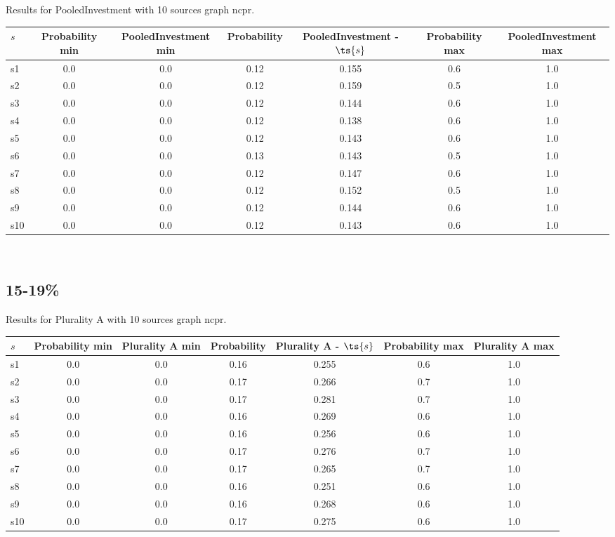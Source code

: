 \documentclass{article}
\begin{document}
\noindent Results for PooledInvestment with 10 sources graph ncpr.

\noindent\begin{tabular}{|l|c|c|c|c|c|c|}
\hline
$s$& Probability min & PooledInvestment min & Probability & PooledInvestment - $\ts{s}$ & Probability max & PooledInvestment max\\
\hline
s1 &0.0 & 0.0 & 0.12 & 0.155 & 0.6 & 1.0\\
\hline
s2 &0.0 & 0.0 & 0.12 & 0.159 & 0.5 & 1.0\\
\hline
s3 &0.0 & 0.0 & 0.12 & 0.144 & 0.6 & 1.0\\
\hline
s4 &0.0 & 0.0 & 0.12 & 0.138 & 0.6 & 1.0\\
\hline
s5 &0.0 & 0.0 & 0.12 & 0.143 & 0.6 & 1.0\\
\hline
s6 &0.0 & 0.0 & 0.13 & 0.143 & 0.5 & 1.0\\
\hline
s7 &0.0 & 0.0 & 0.12 & 0.147 & 0.6 & 1.0\\
\hline
s8 &0.0 & 0.0 & 0.12 & 0.152 & 0.5 & 1.0\\
\hline
s9 &0.0 & 0.0 & 0.12 & 0.144 & 0.6 & 1.0\\
\hline
s10 &0.0 & 0.0 & 0.12 & 0.143 & 0.6 & 1.0\\
\hline
\end{tabular}\\

\newpage

\subsection{15-19\%}

\noindent Results for Plurality A with 10 sources graph ncpr.

\noindent\begin{tabular}{|l|c|c|c|c|c|c|}
\hline
$s$& Probability min & Plurality A min & Probability & Plurality A - $\ts{s}$ & Probability max & Plurality A max\\
\hline
s1 &0.0 & 0.0 & 0.16 & 0.255 & 0.6 & 1.0\\
\hline
s2 &0.0 & 0.0 & 0.17 & 0.266 & 0.7 & 1.0\\
\hline
s3 &0.0 & 0.0 & 0.17 & 0.281 & 0.7 & 1.0\\
\hline
s4 &0.0 & 0.0 & 0.16 & 0.269 & 0.6 & 1.0\\
\hline
s5 &0.0 & 0.0 & 0.16 & 0.256 & 0.6 & 1.0\\
\hline
s6 &0.0 & 0.0 & 0.17 & 0.276 & 0.7 & 1.0\\
\hline
s7 &0.0 & 0.0 & 0.17 & 0.265 & 0.7 & 1.0\\
\hline
s8 &0.0 & 0.0 & 0.16 & 0.251 & 0.6 & 1.0\\
\hline
s9 &0.0 & 0.0 & 0.16 & 0.268 & 0.6 & 1.0\\
\hline
s10 &0.0 & 0.0 & 0.17 & 0.275 & 0.6 & 1.0\\
\hline
\end{tabular}\\
\end{document}
